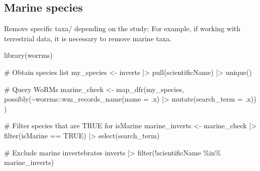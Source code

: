 \documentclass[
  letterpaper,
  DIV=11,
  numbers=noendperiod,
  oneside]{scrreprt}
\newenvironment{Shaded}{\begin{snugshade}}{\end{snugshade}}
\newcommand{\AttributeTok}[1]{\textcolor[rgb]{0.40,0.45,0.13}{#1}}
\newcommand{\CommentTok}[1]{\textcolor[rgb]{0.37,0.37,0.37}{#1}}
\newcommand{\ConstantTok}[1]{\textcolor[rgb]{0.56,0.35,0.01}{#1}}
\newcommand{\FunctionTok}[1]{\textcolor[rgb]{0.28,0.35,0.67}{#1}}
\newcommand{\NormalTok}[1]{\textcolor[rgb]{0.00,0.23,0.31}{#1}}
\newcommand{\OtherTok}[1]{\textcolor[rgb]{0.00,0.23,0.31}{#1}}
\newcommand{\SpecialCharTok}[1]{\textcolor[rgb]{0.37,0.37,0.37}{#1}}
\begin{document}
\hypertarget{marine-species}{%
\subsection{Marine species}\label{marine-species}}

Remove specific taxa/ depending on the study: For example, if working
with terrestrial data, it is necessary to remove marine taxa.

\begin{Shaded}
\begin{Highlighting}[]
\FunctionTok{library}\NormalTok{(worrms)}

\CommentTok{\# Obtain species list}
\NormalTok{my\_species }\OtherTok{\textless{}{-}}\NormalTok{ inverts }\SpecialCharTok{|\textgreater{}} 
  \FunctionTok{pull}\NormalTok{(scientificName) }\SpecialCharTok{|\textgreater{}}
  \FunctionTok{unique}\NormalTok{()}

\CommentTok{\# Query WoRMs}
\NormalTok{marine\_check }\OtherTok{\textless{}{-}} \FunctionTok{map\_dfr}\NormalTok{(my\_species,}
       \FunctionTok{possibly}\NormalTok{(}\SpecialCharTok{\textasciitilde{}}\NormalTok{worrms}\SpecialCharTok{::}\FunctionTok{wm\_records\_name}\NormalTok{(}\AttributeTok{name =}\NormalTok{ .x) }\SpecialCharTok{|\textgreater{}} \FunctionTok{mutate}\NormalTok{(}\AttributeTok{search\_term =}\NormalTok{ .x))}
\NormalTok{)}

\CommentTok{\# Filter species that are TRUE for isMarine}
\NormalTok{marine\_inverts }\OtherTok{\textless{}{-}}\NormalTok{ marine\_check }\SpecialCharTok{|\textgreater{}} 
  \FunctionTok{filter}\NormalTok{(isMarine }\SpecialCharTok{==} \ConstantTok{TRUE}\NormalTok{) }\SpecialCharTok{|\textgreater{}} 
  \FunctionTok{select}\NormalTok{(search\_term)}

\CommentTok{\# Exclude marine invertebrates}
\NormalTok{inverts }\SpecialCharTok{|\textgreater{}} \FunctionTok{filter}\NormalTok{(}\SpecialCharTok{!}\NormalTok{scientificName }\SpecialCharTok{\%in\%}\NormalTok{ marine\_inverts)}
\end{Highlighting}
\end{Shaded}
\end{document}

